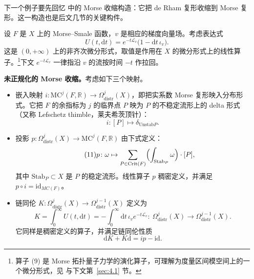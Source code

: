 下一个例子要先回忆 \cite[第 6.5 节]{kontsevichsoibelman} 中的 Morse 收缩构造：它把 de Rham 复形收缩到 Morse 复形。这一构造也是后文几节的关键构件。

设 $F$ 是 $X$ 上的 Morse--Smale 函数，$v$ 是相应的梯度向量场。考虑表达式
\begin{equation}\tag{9}\label{eq:9}
  U(t,\mathrm{d}t)=e^{-t\mathcal L_v}\bigl(1-\mathrm{d}t\,\iota_v\bigr).
\end{equation}
这是 $(0,+\infty)$ 上的非齐次微分形式，取值是作用在 $X$ 的微分形式上的线性算子。\footnote{算子 (9) 是 Morse 拓扑量子力学的演化算子，可理解为度量区间模空间上的一个微分形式，见 \cite{witten,frenkel} 与下文第~\ref{sec:4.1} 节。}下文 $e^{-t\mathcal L_v}$ 一律指沿 $v$ 的流按时间 $-t$ 作拉回。


\textbf{未正规化的 Morse 收缩。}\quad 考虑如下三个映射。

\begin{itemize}
  \item 嵌入映射 $i\colon \mathrm{MC}^j(F,\mathbb R)\to\Omega^j_{\mathrm{distr}}(X)$，即把实系数 Morse 复形映入分布形式。它把 $F$ 的余指标为 $j$ 的临界点 $P$ 映为 $P$ 的不稳定流形上的 delta 形式（又称 Lefschetz thimble，莱夫希茨顶针）：
  \begin{equation}\tag{10}\label{eq:10}
    i\colon[P]\mapsto\delta_{\mathrm{Unstab}P}.
  \end{equation}
  \item 投影 $p\colon\Omega^j_{\mathrm{distr}}(X)\to \mathrm{MC}^j(F,\mathbb R)$ 由下式定义：
  \begin{equation}\tag{11}\label{eq:11}
    p\colon\omega\mapsto\sum_{P\in\mathrm{Crit}(F)}
    \Bigl(\int_{\mathrm{Stab}_P}\omega\Bigr)\cdot[P],
  \end{equation}
  其中 $\mathrm{Stab}_P\subset X$ 是 $P$ 的稳定流形。线性算子 $p$ 稠密定义，并满足 $p\circ i=\mathrm{id}_{MC(F)}$。
  \item 链同伦 $K\colon\Omega^j_{\mathrm{distr}}(X)\to\Omega^{j-1}_{\mathrm{distr}}(X)$ 定义为
  \begin{equation}\tag{12}\label{eq:12}
    K=\int_0^\infty U(t,\mathrm{d}t)
    =-\int_0^\infty \mathrm{d}t\,\iota_v e^{-t\mathcal L_v}
    \colon\ \Omega^j_{\mathrm{distr}}(X)\to\Omega^{j-1}_{\mathrm{distr}}(X).
  \end{equation}
  它同样是稠密定义的算子，并满足链同伦性质
  \begin{equation}\tag{13}\label{eq:13}
    \mathrm{d}K+K\mathrm{d}=ip-\mathrm{id}.
  \end{equation}
\end{itemize}

